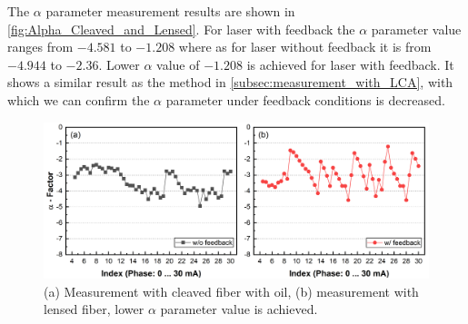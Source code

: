 The $\alpha$ parameter measurement results are shown in \autoref{fig:Alpha_Cleaved_and_Lensed}. For laser with feedback the $\alpha$ parameter value ranges from $-4.581$ to $-1.208$ where as for laser without feedback it is from $-4.944$ to $-2.36$. Lower $\alpha$ value of $-1.208$ is achieved for laser with feedback. It shows a similar result as the method in \autoref{subsec:measurement_with_LCA}, with which we can confirm the $\alpha$ parameter under feedback conditions is decreased.
\begin{figure}[ht]
    \centering
    \includegraphics[width=\linewidth]{figures/Alpha_Cleaved_and_Lensed.png}
    \caption{(a) Measurement with cleaved fiber with oil, (b) measurement with lensed fiber, lower $\alpha$ parameter value is achieved.}
    \label{fig:Alpha_Cleaved_and_Lensed}
\end{figure}


